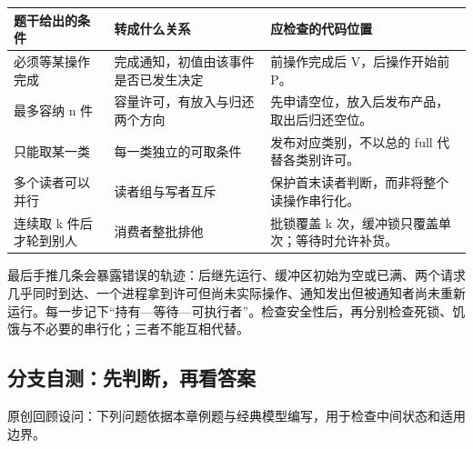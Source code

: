\begin{wideblock}

\par\medskip\noindent\begin{minipage}{\linewidth}\fontsize{9.3}{12}\selectfont\begin{tabularx}{\linewidth}{@{}YYY@{}}
\toprule\noalign{}
\begin{minipage}[b]{\linewidth}\raggedright
题干给出的条件
\end{minipage} & \begin{minipage}[b]{\linewidth}\raggedright
转成什么关系
\end{minipage} & \begin{minipage}[b]{\linewidth}\raggedright
应检查的代码位置
\end{minipage} \\
\midrule\noalign{}


必须等某操作完成 & 完成通知，初值由该事件是否已发生决定 & 前操作完成后 V，后操作开始前 P。 \\
最多容纳 n 件 & 容量许可，有放入与归还两个方向 & 先申请空位，放入后发布产品，取出后归还空位。 \\
只能取某一类 & 每一类独立的可取条件 & 发布对应类别，不以总的 full 代替各类别许可。 \\
多个读者可以并行 & 读者组与写者互斥 & 保护首末读者判断，而非将整个读操作串行化。 \\
连续取 k 件后才轮到别人 & 消费者整批排他 & 批锁覆盖 k 次，缓冲锁只覆盖单次；等待时允许补货。 \\
\bottomrule\end{tabularx}
\end{minipage}\par\medskip

\end{wideblock}

最后手推几条会暴露错误的轨迹：后继先运行、缓冲区初始为空或已满、两个请求几乎同时到达、一个进程拿到许可但尚未实际操作、通知发出但被通知者尚未重新运行。每一步记下``持有---等待---可执行者''。检查安全性后，再分别检查死锁、饥饿与不必要的串行化；三者不能互相代替。

\subsection{分支自测：先判断，再看答案}\label{OS02-selfcheck}

原创回顾设问：下列问题依据本章例题与经典模型编写，用于检查中间状态和适用边界。

